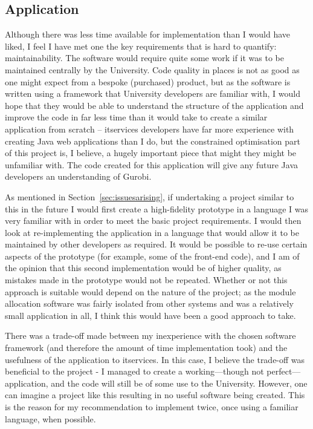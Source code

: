 \subsection{Application}

Although there was less time available for implementation than I would have
liked, I feel I have met one the key requirements that is hard to quantify:
maintainability. The software would require quite some work if it was to be
maintained centrally by the University. Code quality in places is not as good
as one might expect from a bespoke (purchased) product, but as the software is
written using a framework that University developers are familiar with, I
would hope that they would be able to understand the structure of the
application and improve the code in far less time than it would take to create
a similar application from scratch -- \gls{itservices} developers have far
more experience with creating Java web applications than I do, but the
constrained optimisation part of this project is, I believe, a hugely
important piece that might they might be unfamiliar with. The code created for
this application will give any future Java developers an understanding of
Gurobi.

As mentioned in Section~\ref{sec:issuesarising}, if undertaking a project
similar to this in the future I would first create a high-fidelity prototype
in a language I was very familiar with in order to meet the basic project
requirements. I would then look at re-implementing the application in a
language that would allow it to be maintained by other developers as required.
It would be possible to re-use certain aspects of the prototype (for example,
some of the front-end code), and I am of the opinion that this second
implementation would be of higher quality, as mistakes made in the prototype
would not be repeated. Whether or not this approach is suitable would depend
on the nature of the project; as the module allocation software was fairly
isolated from other systems and was a relatively small application in all, I
think this would have been a good approach to take.

There was a trade-off made between my inexperience with the chosen software
framework (and therefore the amount of time implementation took) and the
usefulness of the application to \gls{itservices}. In this case, I believe the
trade-off was beneficial to the project - I managed to create a
working---though not perfect---application, and the code will still be of some
use to the University. However, one can imagine a project like this resulting
in no useful software being created. This is the reason for my recommendation
to implement twice, once using a familiar language, when possible.

